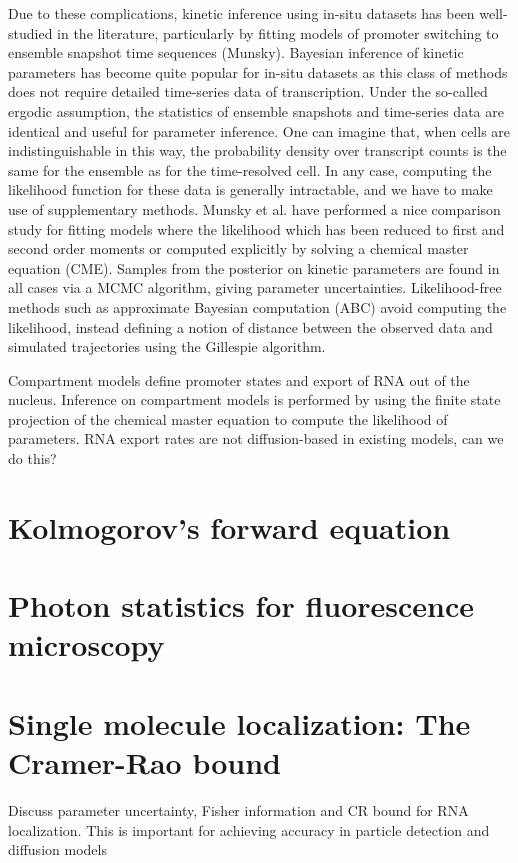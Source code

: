 \documentclass{article}
\begin{document}
Due to these complications, kinetic inference using  in-situ datasets has been well-studied in the literature, particularly by fitting models of promoter switching to ensemble snapshot time sequences (Munsky). Bayesian inference of kinetic parameters has become quite popular for in-situ datasets as this class of methods does not require detailed time-series data of transcription. Under the so-called ergodic assumption, the statistics of ensemble snapshots and time-series data are identical and useful for parameter inference. One can imagine that, when cells are indistinguishable in this way, the probability density over transcript counts is the same for the ensemble as for the time-resolved cell. In any case, computing the likelihood function for these data is generally intractable, and we have to make use of supplementary methods. Munsky et al. have performed a nice comparison study for fitting models where the likelihood which has been reduced to first and second order moments or computed explicitly by solving a chemical master equation (CME). Samples from the posterior on kinetic parameters are found in all cases via a MCMC algorithm, giving parameter uncertainties. Likelihood-free methods such as approximate Bayesian computation (ABC) avoid computing the likelihood, instead defining a notion of distance between the observed data and simulated trajectories using the Gillespie algorithm.


Compartment models define promoter states and export of RNA out of the nucleus. Inference on compartment models is performed by using the finite state projection of the chemical master equation to compute the likelihood of parameters. RNA export rates are not diffusion-based in existing models, can we do this?   


\appendix

\section{Kolmogorov's forward equation}

\section{Photon statistics for fluorescence microscopy}


\section{Single molecule localization: The Cramer-Rao bound}

Discuss parameter uncertainty, Fisher information and CR bound for RNA localization. This is important for achieving accuracy in particle detection and diffusion models
\end{document}
